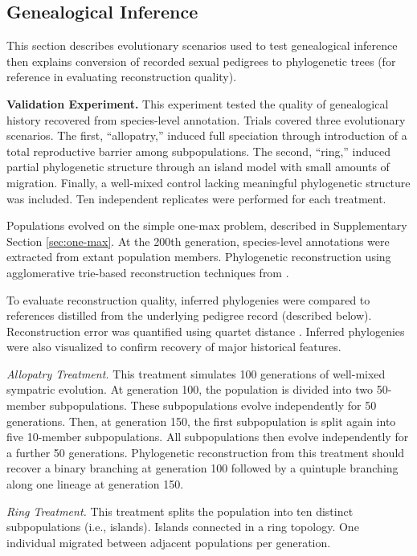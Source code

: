 \subsection{Genealogical Inference}
\label{sec:genealogical-inference}

This section describes evolutionary scenarios used to test genealogical inference then explains conversion of recorded sexual pedigrees to phylogenetic trees (for reference in evaluating reconstruction quality).

\textbf{Validation Experiment.}
This experiment tested the quality of genealogical history recovered from species-level  annotation.
Trials covered three evolutionary scenarios.
The first, ``allopatry,'' induced full speciation through introduction of a total reproductive barrier among subpopulations.
The second, ``ring,'' induced partial phylogenetic structure through an island model with small amounts of migration.
Finally, a well-mixed control lacking meaningful phylogenetic structure was included.
Ten independent replicates were performed for each treatment.

Populations evolved on the simple one-max problem, described in Supplementary Section \ref{sec:one-max}.
At the 200th generation, species-level annotations were extracted from extant population members.
Phylogenetic reconstruction using agglomerative trie-based reconstruction techniques from \citep{moreno2023toward}.

To evaluate reconstruction quality, inferred phylogenies were compared to references distilled from the underlying pedigree record (described below).
Reconstruction error was quantified using quartet distance \citep{estabrook1985comparisonm,sand2014tqdist}.
Inferred phylogenies were also visualized to confirm recovery of major historical features.

\textit{Allopatry Treatment.}
This treatment simulates 100 generations of well-mixed sympatric evolution.
At generation 100, the population is divided into two 50-member subpopulations.
These subpopulations evolve independently for 50 generations.
Then, at generation 150, the first subpopulation is split again into five 10-member subpopulations.
All subpopulations then evolve independently for a further 50 generations.
Phylogenetic reconstruction from this treatment should recover a binary branching at generation 100 followed by a quintuple branching along one lineage at generation 150.

\textit{Ring Treatment.}
This treatment splits the population into ten distinct subpopulations (i.e., islands).
Islands connected in a ring topology.
One individual migrated between adjacent populations per generation.

